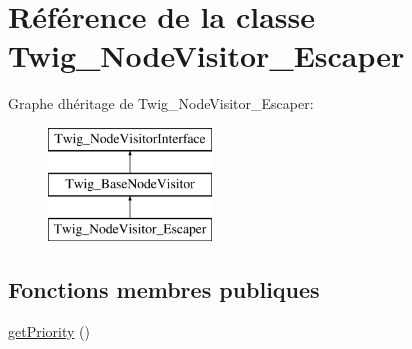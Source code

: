 \hypertarget{class_twig___node_visitor___escaper}{}\section{Référence de la classe Twig\+\_\+\+Node\+Visitor\+\_\+\+Escaper}
\label{class_twig___node_visitor___escaper}
Graphe d\textquotesingle{}héritage de Twig\+\_\+\+Node\+Visitor\+\_\+\+Escaper\+:\begin{figure}[H]
\begin{center}
\leavevmode
\includegraphics[height=3.000000cm]{class_twig___node_visitor___escaper}
\end{center}
\end{figure}
\subsection*{Fonctions membres publiques}
\begin{DoxyCompactItemize}
\item 
\hyperlink{class_twig___node_visitor___escaper_a1e7a3c168dcd0901a0d2669c67575b55}{get\+Priority} ()
\end{DoxyCompactItemize}
